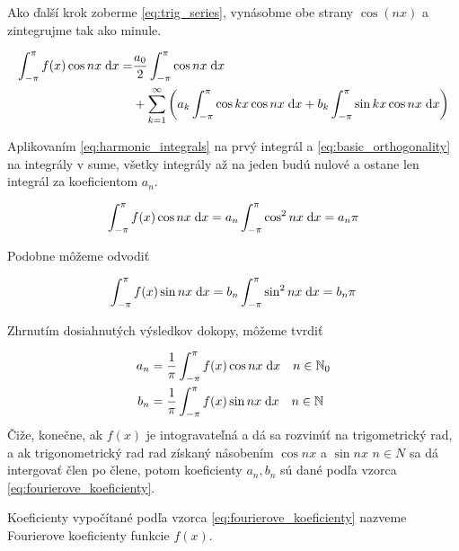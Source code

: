 Ako ďalší krok zoberme \ref{eq:trig_series}, vynásobme obe strany
$\cos(nx)$ a zintegrujme tak ako minule.

\begin{equation}
    \begin{split}
    \int_{-\pi}^{\pi} f(x) \cos nx  \; \mathrm{d} x =& \frac{a_0}{2} \int_{-\pi}^{\pi} \cos nx \; \mathrm{d} x 
    \\ &+
        \sum_{k=1}^{\infty} \left(
            a_k \int_{-\pi}^{\pi} \cos kx \cos nx \; \mathrm{d} x + 
            b_k \int_{-\pi}^{\pi} \sin kx \cos nx \; \mathrm{d} x
        \right)
    \end{split}
\end{equation}

Aplikovaním \ref{eq:harmonic_integrals} na prvý integrál a 
\ref{eq:basic_orthogonality} na integrály v sume, všetky integrály
až na jeden budú nulové a ostane len integrál za koeficientom $a_n$.

\begin{equation}
    \int_{-\pi}^{\pi} f(x) \cos nx \; \mathrm{d} x = a_n \int_{-\pi}^{\pi} \cos^2 nx \; \mathrm{d} x = a_n \pi
\end{equation}

Podobne môžeme odvodiť

\begin{equation}
    \int_{-\pi}^{\pi} f(x) \sin nx \; \mathrm{d} x = b_n \int_{-\pi}^{\pi} \sin^2 nx \; \mathrm{d} x = b_n \pi
\end{equation}

Zhrnutím dosiahnutých výsledkov dokopy, môžeme tvrdiť

\begin{align}
    a_n &=  \frac{1}{\pi} \int_{-\pi}^{\pi} f(x) \cos n x \; \mathrm{d} x \quad n\in \mathbb{N}_0
     \nonumber \\
    b_n &=  \frac{1}{\pi} \int_{-\pi}^{\pi} f(x) \sin n x \; \mathrm{d} x \quad n\in \mathbb{N}
    \label{eq:fourierove_koeficienty}
\end{align}
Čiže, konečne, ak $f(x)$ je intogravateľná a dá sa rozvinúť na
trigometrický rad, a ak trigonometrický rad rad získaný násobením
$\cos nx$ a $\sin nx$ $n\in N$ sa dá intergovať člen po člene,
potom koeficienty $a_n, b_n$ sú dané podľa vzorca
\ref{eq:fourierove_koeficienty}.

\begin{definicia}
    Koeficienty vypočítané podľa vzorca
    \ref{eq:fourierove_koeficienty} nazveme Fourierove koeficienty
    funkcie $f(x)$.
\end{definicia}


